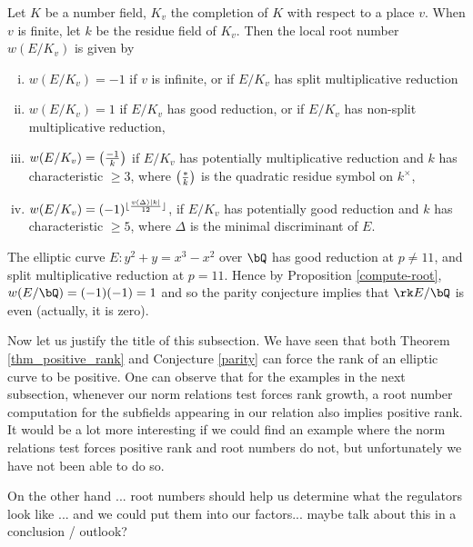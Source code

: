 \begin{prop}\cite[Theorem 3.1]{DD-BSD}\label{compute-root}
    Let $K$ be a number field, $K_v$ the completion of $K$ with respect to a place $v$. When $v$ is finite, 
    let $k$ be the residue field of $K_v$. Then the local root number $w(E / K_v)$ is given by 
    \begin{enumerate}[(i)]
        \setlength\itemsep{0em}
        \item $w(E / K_v) = -1$ if $v$ is infinite, or if  $E / K_v$ has split multiplicative reduction
        \item $w(E / K_v) = 1$ if $E / K_v$ has good reduction, or if $E / K_v$ has non-split multiplicative reduction, 
        \item $w(E / K_v) = \left( \frac{-1}{k} \right) $ if $E / K_v$ has potentially multiplicative reduction and $k$ has characteristic $\geq 3$, where $\left( \frac{*}{k} \right) $ is the quadratic residue symbol on $k^{\times}$,
        \item $w(E / K_v) = (-1)^{\lfloor\frac{v(\Delta)|k|}{12}\rfloor}$, if $E / K_v$ has potentially good reduction and $k$ has characteristic $\geq 5$, where $\Delta$ is the minimal discriminant of $E$.  
    \end{enumerate} 
\end{prop}

\begin{example}
    The elliptic curve $E \colon y^2 + y = x^3  - x^2$ over $\bQ$ has good reduction at $p \not= 11$, and split multiplicative reduction at $p = 11$. Hence by Proposition \ref{compute-root}, $w(E / \bQ) = (-1)(-1) = 1$ and so the parity conjecture implies that $\rk E / \bQ$ is even (actually, it is zero). 
\end{example}

Now let us justify the title of this subsection. We have seen that both Theorem \ref{thm_positive_rank} and Conjecture \ref{parity} can force the rank of an elliptic curve to be positive. One can observe that for the examples in the next subsection, whenever our norm relations test forces rank growth, a root number computation for the subfields appearing in our relation also implies positive rank. It would be a lot more interesting if we could find an example where the norm relations test forces positive rank and root numbers do not, but unfortunately we have not been able to do so. 

{\color{red} On the other hand ... root numbers should help us determine what the regulators look like ... and we could put them into our factors... maybe talk about this in a conclusion / outlook?}


